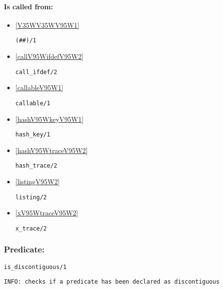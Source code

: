 \paragraph{Is called from:} 
\begin{itemize}
\item \ref{V35WV35WV95W1} 
\begin{verbatim}
(##)/1
\end{verbatim}

\item \ref{callV95WifdefV95W2} 
\begin{verbatim}
call_ifdef/2
\end{verbatim}

\item \ref{callableV95W1} 
\begin{verbatim}
callable/1
\end{verbatim}

\item \ref{hashV95WkeyV95W1} 
\begin{verbatim}
hash_key/1
\end{verbatim}

\item \ref{hashV95WtraceV95W2} 
\begin{verbatim}
hash_trace/2
\end{verbatim}

\item \ref{listingV95W2} 
\begin{verbatim}
listing/2
\end{verbatim}

\item \ref{xV95WtraceV95W2} 
\begin{verbatim}
x_trace/2
\end{verbatim}

\end{itemize}

\subsubsection{Predicate:} \label{isV95WdiscontiguousV95W1}

\begin{verbatim}
is_discontiguous/1
\end{verbatim}

{\small \begin{verbatim}
INFO: checks if a predicate has been declared as discontiguous

\end{verbatim}}

